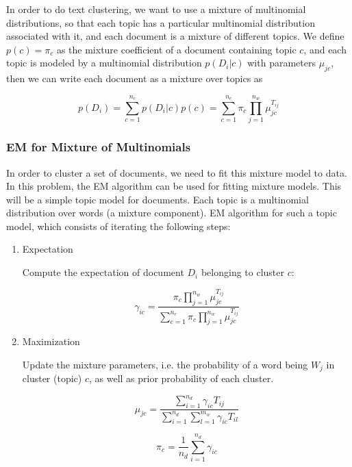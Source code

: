 \documentclass[twoside,10pt]{article}
\begin{document}
In order to do text clustering, we want to use a mixture of
multinomial distributions, so that each topic has a particular
multinomial distribution associated with it, and each document is a
mixture of different topics. We define $p(c) = \pi_c $  as the
mixture coefficient of a document containing topic $c$, and each topic
is modeled by a multinomial distribution $p(D_i|c)$ with parameters
$\mu_{jc}$, then we can write each document as a mixture over topics
as


\begin{equation}
p(D_i) = \sum_{c=1}^{n_c} p(D_i|c)p(c) = \sum_{c=1}^{n_c} \pi_c
\prod_{j=1}^{n_w} \mu_{jc}^{T_{ij}}\nonumber
\end{equation}

\subsubsection*{EM for Mixture of Multinomials}

In order to cluster a set of documents, we need to fit this mixture
model to data. In this problem, the EM algorithm can be used for
fitting mixture models. This will be a simple topic model for
documents. Each topic is a multinomial distribution over words (a
mixture component). EM algorithm for such a topic model, which
consists of iterating the following steps:

\begin{enumerate}
\item Expectation

Compute the expectation of document $D_i$ belonging to cluster $c$:

\begin{equation}
\gamma_{ic} =  \frac{\pi_c \prod_{j=1}^{n_w}
\mu_{jc}^{T_{ij}}}{\sum_{c=1}^{n_c} \pi_c \prod_{j=1}^{n_w}
\mu_{jc}^{T_{ij}}}\nonumber
\end{equation}

\item Maximization

Update the mixture parameters, i.e. the probability of a word being
$W_j$ in cluster (topic) $c$, as well as prior probability of each
cluster.


\begin{equation}
\mu_{jc} =
\frac{\sum_{i=1}^{n_d}\gamma_{ic}T_{ij}}{\sum_{i=1}^{n_d}\sum_{l=1}^{m_w}
\gamma_{ic}T_{il}}\nonumber
\end{equation}

\begin{equation}
 \pi_c = \frac{1}{n_d}
\sum_{i=1}^{n_d}\gamma_{ic}\nonumber
\end{equation}

\end{enumerate}
\end{document}

